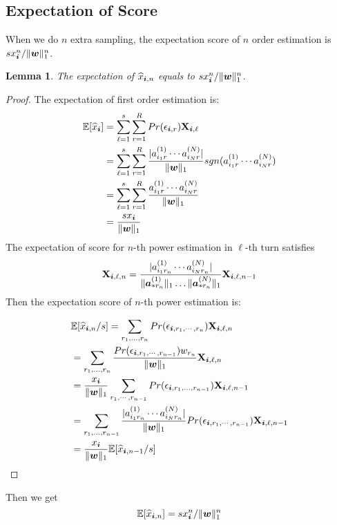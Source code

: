 \documentclass[letterpaper]{article}
\newcommand{\Sca}[3]{{#1}^{(#2)}_{i_#2#3}}%
\newcommand{\V}[1]{{\bm{{\MakeLowercase{#1}}}}}
\newcommand{\VnC}[3]{\V{#1}^{(#2)}_{#3}}
\newcommand{\Nrocl}[2]{\norm{\VnC{a}{#1}{*#2}}{1}}
\newcommand{\M}[1]{{\bm{\mathbf{\MakeUppercase{#1}}}}}
\newcommand{\norm}[2]{\|#1\|_{#2}}
\newtheorem{lemma}{Lemma}
\begin{document}
\subsection{Expectation of Score}
When we do $n$ extra sampling, the expectation score of $n$ order estimation is
$sx_{\V{i}}^n/\norm{\V{w}}{1}^n$.
\begin{lemma}\label{lem:Expectation}
The expectation of $\widehat{x}_{\V{i},n}$ equals to $sx_{\V{i}}^n/\norm{\V{w}}{1}^n$.
\end{lemma}
\begin{proof} The expectation of first order estimation is:
\begin{align*}
\mathbb{E}[\widehat{x}_{\V{i}}]& =\sum_{\ell=1}^{s}\sum_{r=1}^{R} Pr(\epsilon_{\V{i},r})\M{X}_{\V{i},\ell}\\
& = \sum_{\ell=1}^{s}\sum_{r=1}^{R} \frac{|\Sca{a}{1}{r}\cdots\Sca{a}{N}{r}|}{\norm{\V{W}}{1}}sgn(\Sca{a}{1}{r}\cdots\Sca{a}{N}{r})\\
& = \sum_{\ell=1}^{s}\sum_{r=1}^{R} \frac{\Sca{a}{1}{r}\cdots\Sca{a}{N}{r}}{\norm{\V{W}}{1}}\\
& = \frac{sx_{\V{i}}}{\norm{\V{w}}{1}}
\end{align*}
The expectation of score for $n$-th power estimation in $\ell$-th turn satisfies
\[
\M{X}_{\V{i},\ell,n}  = \frac{|\Sca{a}{1}{r_n}\cdots\Sca{a}{N}{r_n}|}{\Nrocl{1}{r_n}\ldots\Nrocl{N}{r_n}}
\M{X}_{\V{i},\ell,n-1}
\]
Then the expectation score of $n$-th power estimation is:

\begin{align*}
& \mathbb{E}[\widehat{x}_{\V{i},n}/s] 
= \sum_{r_1,\ldots,r_n}Pr(\epsilon_{\V{i},r_1,\cdots,r_n})\M{X}_{\V{i},\ell,n}\\
& = \sum_{r_1,\ldots,r_n}
\frac{Pr(\epsilon_{\V{i},r_1,\cdots,r_{n-1}})w_{r_n}}{\norm{\V{w}}{1}}\M{X}_{\V{i},\ell,n}\\
& = \frac{x_{\V{i}}}{\norm{\V{w}}{1}}\sum_{r_1,\cdots,r_{n-1}}
Pr(\epsilon_{\V{i},r_1,\ldots,r_{n-1}})\M{X}_{\V{i},\ell,n-1}\\
& = \sum_{r_1,\ldots,r_{n-1}}
\frac{|\Sca{a}{1}{r_n}\cdots\Sca{a}{N}{r_n}|}{\norm{\V{w}}{1}}
Pr(\epsilon_{\V{i},r_1,\cdots,r_{n-1}})\M{X}_{\V{i},\ell,n-1}\\
& = \frac{x_{\V{i}}}{\norm{\V{w}}{1}}\mathbb{E}[\widehat{x}_{\V{i},n-1}/s]
\end{align*}
\end{proof}
Then we get
\begin{equation}
\mathbb{E}[\widehat{x}_{\V{i},n}] = sx^n_{\V{i}}/\norm{\V{w}}{1}^n
\end{equation}
\end{document}
